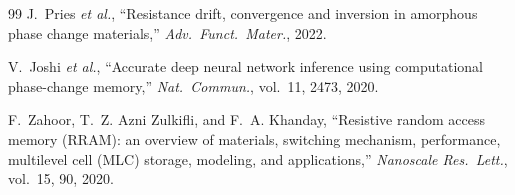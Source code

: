 \documentclass[conference,10pt]{IEEEtran}
\begin{document}
\begin{thebibliography}{99}
J.~Pries \emph{et al.}, ``Resistance drift, convergence and inversion in
amorphous phase change materials,'' \emph{Adv.\ Funct.\ Mater.}, 2022.

V.~Joshi \emph{et al.}, ``Accurate deep neural network inference using
computational phase-change memory,'' \emph{Nat.\ Commun.}, vol.~11, 2473,
2020.

F.~Zahoor, T.~Z. Azni Zulkifli, and F.~A. Khanday, ``Resistive random access
memory (RRAM): an overview of materials, switching mechanism, performance,
multilevel cell (MLC) storage, modeling, and applications,'' \emph{Nanoscale
Res.\ Lett.}, vol.~15, 90, 2020.

\end{thebibliography}
\end{document}
